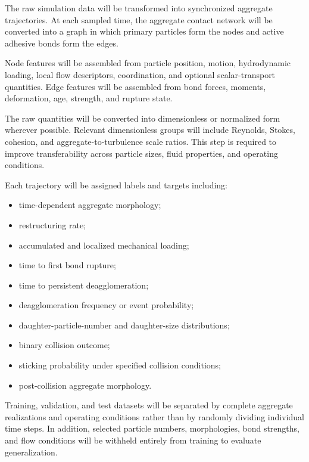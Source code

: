 \documentclass[11pt,a4paper,twoside]{scrartcl}
\begin{document}
The raw simulation data will be transformed into synchronized aggregate trajectories. At each sampled time, the aggregate contact network will be converted into a graph in which primary particles form the nodes and active adhesive bonds form the edges.

Node features will be assembled from particle position, motion, hydrodynamic loading, local flow descriptors, coordination, and optional scalar-transport quantities. Edge features will be assembled from bond forces, moments, deformation, age, strength, and rupture state.

The raw quantities will be converted into dimensionless or normalized form wherever possible. Relevant dimensionless groups will include Reynolds, Stokes, cohesion, and aggregate-to-turbulence scale ratios. This step is required to improve transferability across particle sizes, fluid properties, and operating conditions.

Each trajectory will be assigned labels and targets including:

\begin{itemize}
	\item time-dependent aggregate morphology;
	
	\item restructuring rate;
	
	\item accumulated and localized mechanical loading;
	
	\item time to first bond rupture;
	
	\item time to persistent deagglomeration;
	
	\item deagglomeration frequency or event probability;
	
	\item daughter-particle-number and daughter-size distributions;
	
	\item binary collision outcome;
	
	\item sticking probability under specified collision conditions;
	
	\item post-collision aggregate morphology.
\end{itemize}

Training, validation, and test datasets will be separated by complete aggregate realizations and operating conditions rather than by randomly dividing individual time steps. In addition, selected particle numbers, morphologies, bond strengths, and flow conditions will be withheld entirely from training to evaluate generalization.
\end{document}
